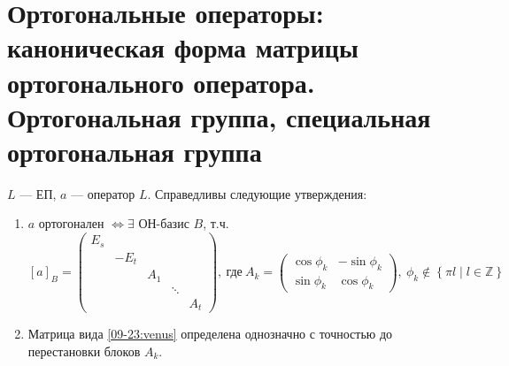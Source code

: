 \section{Ортогональные операторы: каноническая форма матрицы ортогонального оператора. Ортогональная группа, специальная ортогональная группа}

\begin{thm*}
    $L$ --- ЕП, $a$ --- оператор $L$. Справедливы следующие утверждения:
    \begin{enumerate}
        \item $a$ ортогонален $\Leftrightarrow \exists$ ОН-базис $B$, т.ч.
        \begin{equation}\label{09-23:venus}\tag{\Venus}
            [a]_B = \begin{pmatrix}
                E_s &      &     &        & \\
                    & -E_t &     &        & \\
                    &      & A_1 &        & \\
                    &      &     & \ddots & \\
                    &      &     &        & A_t
            \end{pmatrix},\
            \text{где}\ A_k = \begin{pmatrix}
                \cos \phi_k & -\sin \phi_k \\
                \sin \phi_k & \cos \phi_k
            \end{pmatrix},\ \phi_k \not\in \left\{\pi l \mid l \in \mathbb{Z} \right\}
        \end{equation}
        \item Матрица вида \eqref{09-23:venus} определена однозначно с точностью до перестановки блоков $A_k$.
    \end{enumerate}
\end{thm*}

